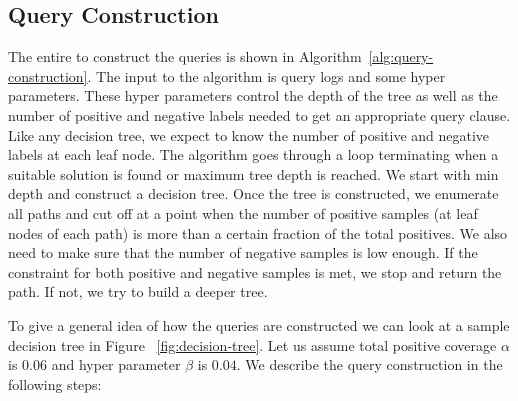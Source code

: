 \subsection{Query Construction}

The entire to construct the queries is shown in
Algorithm~\ref{alg:query-construction}. The input to the algorithm is query
logs and some hyper parameters. These hyper parameters control the depth of the
tree as well as the number of positive and negative labels needed to get an
appropriate query clause. Like any decision tree, we expect to know the number
of positive and negative labels at each leaf node. The algorithm goes through a
loop terminating when a suitable solution is found or maximum tree depth is
reached. We start with min depth and construct a decision tree. Once the tree
is constructed, we enumerate all paths and cut off at a point when the number of
positive samples (at leaf nodes of each path) is more than a certain fraction
of the total positives. We also need to make sure that the number of negative
samples is low enough. If the constraint for both positive and negative samples
is met, we stop and return the path. If not, we try to build a deeper tree.

To give a general idea of how the queries are constructed we can look at a sample decision tree in Figure ~\ref{fig:decision-tree}.
Let us assume total positive coverage $\alpha$ is $0.06$ and hyper parameter $\beta$ is $0.04$. We describe the query construction in the following steps: 

